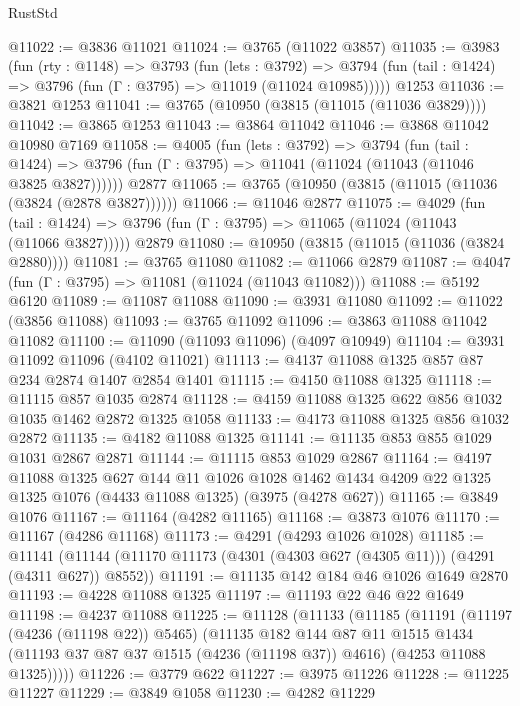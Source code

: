 \begin{lexlean}{RustStd}
\begin{coremodule}
@11022 := @3836 @11021
@11024 := @3765 (@11022 @3857)
@11035 := @3983
    (fun (rty : @1148) =>
    @3793
      (fun (lets : @3792) =>
      @3794 (fun (tail : @1424) => @3796 (fun (Γ : @3795) => @11019 (@11024 @10985)))))
    @1253
@11036 := @3821 @1253
@11041 := @3765 (@10950 (@3815 (@11015 (@11036 @3829))))
@11042 := @3865 @1253
@11043 := @3864 @11042
@11046 := @3868 @11042 @10980 @7169
@11058 := @4005
    (fun (lets : @3792) =>
    @3794
      (fun (tail : @1424) =>
      @3796 (fun (Γ : @3795) => @11041 (@11024 (@11043 (@11046 @3825 @3827))))))
    @2877
@11065 := @3765 (@10950 (@3815 (@11015 (@11036 (@3824 (@2878 @3827))))))
@11066 := @11046 @2877
@11075 := @4029
    (fun (tail : @1424) => @3796 (fun (Γ : @3795) => @11065 (@11024 (@11043 (@11066 @3827)))))
    @2879
@11080 := @10950 (@3815 (@11015 (@11036 (@3824 @2880))))
@11081 := @3765 @11080
@11082 := @11066 @2879
@11087 := @4047 (fun (Γ : @3795) => @11081 (@11024 (@11043 @11082)))
@11088 := @5192 @6120
@11089 := @11087 @11088
@11090 := @3931 @11080
@11092 := @11022 (@3856 @11088)
@11093 := @3765 @11092
@11096 := @3863 @11088 @11042 @11082
@11100 := @11090 (@11093 @11096) (@4097 @10949)
@11104 := @3931 @11092 @11096 (@4102 @11021)
@11113 := @4137 @11088 @1325 @857 @87 @234 @2874 @1407 @2854 @1401
@11115 := @4150 @11088 @1325
@11118 := @11115 @857 @1035 @2874
@11128 := @4159 @11088 @1325 @622 @856 @1032 @1035 @1462 @2872 @1325 @1058
@11133 := @4173 @11088 @1325 @856 @1032 @2872
@11135 := @4182 @11088 @1325
@11141 := @11135 @853 @855 @1029 @1031 @2867 @2871
@11144 := @11115 @853 @1029 @2867
@11164 := @4197
    @11088
    @1325
    @627
    @144
    @11
    @1026
    @1028
    @1462
    @1434
    @4209
    @22
    @1325
    @1325
    @1076
    (@4433 @11088 @1325)
    (@3975 (@4278 @627))
@11165 := @3849 @1076
@11167 := @11164 (@4282 @11165)
@11168 := @3873 @1076
@11170 := @11167 (@4286 @11168)
@11173 := @4291 (@4293 @1026 @1028)
@11185 := @11141
    (@11144 (@11170 @11173 (@4301 (@4303 @627 (@4305 @11))) (@4291 (@4311 @627)) @8552))
@11191 := @11135 @142 @184 @46 @1026 @1649 @2870
@11193 := @4228 @11088 @1325
@11197 := @11193 @22 @46 @22 @1649
@11198 := @4237 @11088
@11225 := @11128
    (@11133
      (@11185
        (@11191
          (@11197 (@4236 (@11198 @22)) @5465)
          (@11135
            @182
            @144
            @87
            @11
            @1515
            @1434
            (@11193 @37 @87 @37 @1515 (@4236 (@11198 @37)) @4616)
            (@4253 @11088 @1325)))))
@11226 := @3779 @622
@11227 := @3975 @11226
@11228 := @11225 @11227
@11229 := @3849 @1058
@11230 := @4282 @11229

\end{coremodule}
\end{lexlean}
